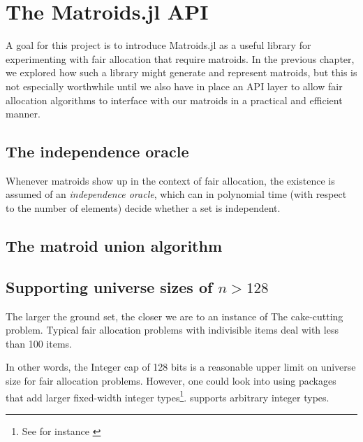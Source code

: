 \chapter{The Matroids.jl API}
A goal for this project is to introduce Matroids.jl as a useful library for experimenting with fair allocation that require matroids. In the previous chapter, we explored how such a library might generate and represent matroids, but this is not especially worthwhile until we also have in place an API layer to allow fair allocation algorithms to interface with our matroids in a practical and efficient manner.

\section{The independence oracle}
Whenever matroids show up in the context of fair allocation, the existence is assumed of an \textit{independence oracle}, which can in polynomial time (with respect to the number of elements) decide whether a set is independent. 


\section{The matroid union algorithm}
\skelpar


\section{Supporting universe sizes of \texorpdfstring{$n > 128$}{n > 128}}
The larger the ground set, the closer we are to an instance of The cake-cutting problem. Typical fair allocation problems with indivisible items deal with less than 100 items. 

In other words, the Integer cap of 128 bits is a reasonable upper limit on universe size for fair allocation problems. However, one could look into using packages that add larger fixed-width integer types\footnote{See for instance \href{https://github.com/rfourquet/BitIntegers.jl}{}}.  supports arbitrary integer types. 